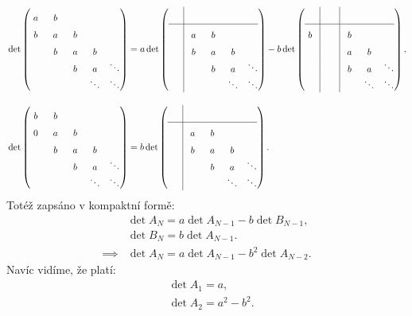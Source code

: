 \documentclass[10pt,a4paper]{article}
\makeatletter
\newcommand{\mat}[1]{
    \begin{pmatrix}
        #1
    \end{pmatrix}
}
\newcommand{\mata}[2]{
    \left(
    \begin{array}{@{}#1@{}}
        #2
    \end{array}
    \right)
}
\makeatother
\begin{document}
\begin{align*}
    &\det
    \mat{
        a & b & \vphantom{\ddots} \\
        b & a & b & \vphantom{\ddots} \\
          & b & a & b & \vphantom{\ddots} \\
          &   & b & a   & \ddots \\
        \phantom{\ddots} & \phantom{\ddots} & \phantom{\ddots} & \ddots & \ddots
    }
    =
    a \det
    \mata{c|cccc}{
          &   & \vphantom{\ddots} \\\hline
          & a & b & \vphantom{\ddots} \\
          & b & a & b & \vphantom{\ddots} \\
          &   & b & a   & \ddots \\
        \phantom{\ddots} & \phantom{\ddots} & \phantom{\ddots} & \ddots & \ddots
    }
    -
    b \det
    \mata{c|c|ccc}{
          &   & \vphantom{\ddots} \\\hline
        b &   & b & \vphantom{\ddots} \\
          &   & a & b & \vphantom{\ddots} \\
          &   & b & a   & \ddots \\
        \phantom{\ddots} & \phantom{\ddots} & \phantom{\ddots} & \ddots & \ddots
    },
    \\[10pt]
    &\det
    \mat{
        b & b & \vphantom{\ddots} \\
        0 & a & b & \vphantom{\ddots} \\
          & b & a & b & \vphantom{\ddots} \\
          &   & b & a   & \ddots \\
        \phantom{\ddots} & \phantom{\ddots} & \phantom{\ddots} & \ddots & \ddots
    }
    =
    b \det
    \mata{c|cccc}{
          &   & \vphantom{\ddots} \\\hline
          & a & b & \vphantom{\ddots} \\
          & b & a & b & \vphantom{\ddots} \\
          &   & b & a   & \ddots \\
        \phantom{\ddots} & \phantom{\ddots} & \phantom{\ddots} & \ddots & \ddots
    }.
    \\
\end{align*}
Totéž zapsáno v kompaktní formě:
\begin{align*}
    &\det A_N = a \det A_{N-1} - b \det B_{N-1}, \\
    &\det B_N = b \det A_{N-1}.
    \\[5pt]
    \implies &\det A_N = a \det A_{N-1} - b^2 \det A_{N-2}.
\end{align*}
Navíc vidíme, že platí:
\begin{align*}
    &\det A_1 = a, \\
    &\det A_2 = a^2 - b^2.
\end{align*}
\end{document}
